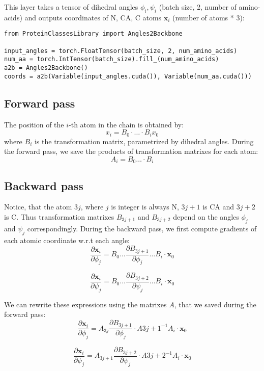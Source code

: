 This layer takes a tensor of dihedral angles $\phi_i, \psi_i$ (batch size, 2, number of amino-acids) 
and outputs coordinates of N, CA, C atoms $\mathbf{x}_i$ (number of atoms * 3):

\begin{lstlisting}
from ProteinClassesLibrary import Angles2Backbone

input_angles = torch.FloatTensor(batch_size, 2, num_amino_acids)
num_aa = torch.IntTensor(batch_size).fill_(num_amino_acids)
a2b = Angles2Backbone()
coords = a2b(Variable(input_angles.cuda()), Variable(num_aa.cuda()))
\end{lstlisting}


\subsection{Forward pass}

The position of the $i$-th atom in the chain is obtained by:
$$x_i = B_0 \cdot \dots \cdot B_i x_0$$
where $B_i$ is the transformation matrix, parametrized by dihedral angles.
During the forward pass, we save the products of transformation matrixes for each atom:
$$A_i = B_0 \dots \cdot B_i$$

\subsection{Backward pass}
Notice, that the atom $3j$, where $j$ is integer is always N, $3j + 1$ is CA and $3j+2$ is C. Thus
transformation matrixes $B_{3j+1}$ and $B_{3j+2}$ depend on the angles $\phi_j$ and $\psi_j$ correspondingly.
During the backward pass, we first compute gradients of each atomic coordinate w.r.t each angle:
$$
\frac{\partial \mathbf{x}_i}{\partial \phi_j} = B_0 \dots \frac{\partial B_{3j+1}}{\partial \phi_j} \dots B_i \cdot \mathbf{x}_0
$$

$$
\frac{\partial \mathbf{x}_i}{\partial \psi_j} = B_0 \dots \frac{\partial B_{3j+2}}{\partial \psi_j} \dots B_i \cdot \mathbf{x}_0
$$

We can rewrite these expressions using the matrixes $A$, that we saved during the forward pass:
$$
\frac{\partial \mathbf{x}_i}{\partial \phi_j} = A_{3j}  \frac{\partial B_{3j+1}}{\partial \phi_j} \cdot A{3j+1}^{-1} A_{i} \cdot \mathbf{x}_0
$$

$$
\frac{\partial \mathbf{x}_i}{\partial \psi_j} = A_{3j+1}  \frac{\partial B_{3j+2}}{\partial \psi_j} \cdot A{3j+2}^{-1} A_{i} \cdot \mathbf{x}_0
$$

